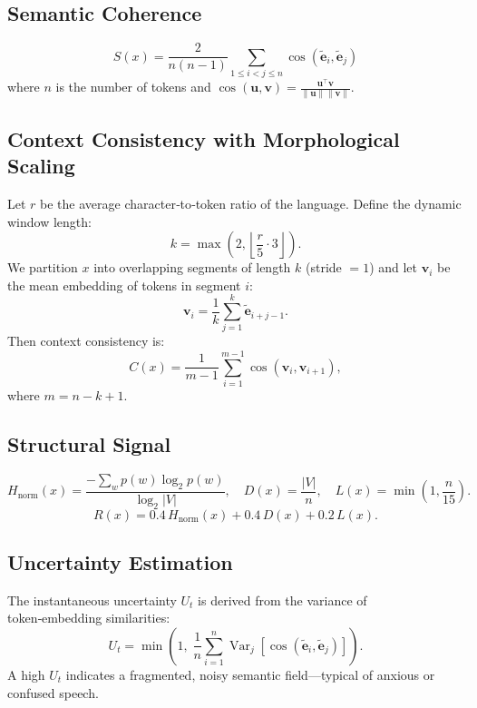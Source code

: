 \documentclass[11pt]{article}
\DeclareMathOperator{\Var}{Var}
\theoremstyle{definition}
\begin{document}
\subsection{Semantic Coherence}
\begin{equation}
S(x) = \frac{2}{n(n-1)} \sum_{1 \le i < j \le n} \cos(\tilde{\mathbf{e}}_i, \tilde{\mathbf{e}}_j)
\end{equation}
where \(n\) is the number of tokens and \(\cos(\mathbf{u},\mathbf{v}) = \frac{\mathbf{u}^\top \mathbf{v}}{\|\mathbf{u}\|\|\mathbf{v}\|}\).

\subsection{Context Consistency with Morphological Scaling}
Let \(r\) be the average character‑to‑token ratio of the language. Define the dynamic window length:
\[
k = \max\left(2, \left\lfloor \frac{r}{5} \cdot 3 \right\rfloor\right).
\]
We partition \(x\) into overlapping segments of length \(k\) (stride \(=1\)) and let \(\mathbf{v}_i\) be the mean embedding of tokens in segment \(i\):
\[
\mathbf{v}_i = \frac{1}{k} \sum_{j=1}^{k} \tilde{\mathbf{e}}_{i+j-1}.
\]
Then context consistency is:
\begin{equation}
C(x) = \frac{1}{m-1} \sum_{i=1}^{m-1} \cos(\mathbf{v}_i, \mathbf{v}_{i+1}),
\end{equation}
where \(m = n - k + 1\).

\subsection{Structural Signal}
\[
H_{\text{norm}}(x) = \frac{-\sum_{w} p(w)\log_2 p(w)}{\log_2 |V|}, \quad
D(x) = \frac{|V|}{n}, \quad
L(x) = \min\left(1, \frac{n}{15}\right).
\]
\begin{equation}
R(x) = 0.4 \, H_{\text{norm}}(x) + 0.4 \, D(x) + 0.2 \, L(x).
\end{equation}

\subsection{Uncertainty Estimation}
The instantaneous uncertainty \(U_t\) is derived from the variance of token‑embedding similarities:
\[
U_t = \min\!\left(1,\; \frac{1}{n}\sum_{i=1}^n \Var_j[\cos(\tilde{\mathbf{e}}_i,\tilde{\mathbf{e}}_j)] \right).
\]
A high \(U_t\) indicates a fragmented, noisy semantic field—typical of anxious or confused speech.
\end{document}
